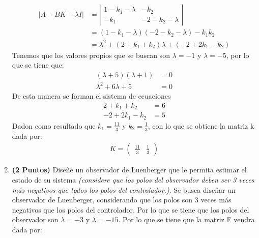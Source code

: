 \begin{enumerate}
\begin{align}
        |A - BK - \lambda I| &= \left| \begin{matrix} 1 - k_1 - \lambda & -k_2 \\ -k_1 & -2 - k_2 - \lambda \end{matrix} \right| \\
        &= (1 - k_1 - \lambda)(-2 - k_2 - \lambda) - k_1 k_2 \\
        &= \lambda^2 + (2 + k_1 + k_2)\lambda + (- 2 + 2k_1 -k_2)
    \end{align}
    Tenemos que los valores propios que se buscan son $\lambda = -1$ y $\lambda = -5$, por lo que se tiene que:
    \begin{align}
        (\lambda + 5)(\lambda + 1) &= 0\\
        \lambda^2 + 6\lambda + 5 &= 0
    \end{align}
    De esta manera se forman el sistema de ecuaciones
    \begin{align}
        2 + k_1 + k_2 &= 6\\
        - 2 + 2k_1 -k_2 &= 5
    \end{align}
    Dadon como resultado que $k_1 = \frac{11}{3}$ y $k_2 = \frac{1}{3}$, con lo que se obtiene la matriz k dada por:
    \begin{align}
        K = \begin{pmatrix} \frac{11}{3} & \frac{1}{3} \end{pmatrix}
    \end{align}

    \item \textbf{(2 Puntos)} Diseñe un observador de Luenberger que le permita estimar el estado de su sistema \textit{(considere que los polos del observador deben ser 3 veces más negativos que todos los polos del controlador.)}.
    Se busca diseñar un observador de Luenberger, considerando que los polos son 3 veces más negativos que los polos del controlador. Por lo que se tiene que los polos del observador son $\lambda = -3$ y $\lambda = -15$. Por lo que se tiene que la matriz F vendra dada por:
    

\end{enumerate}
